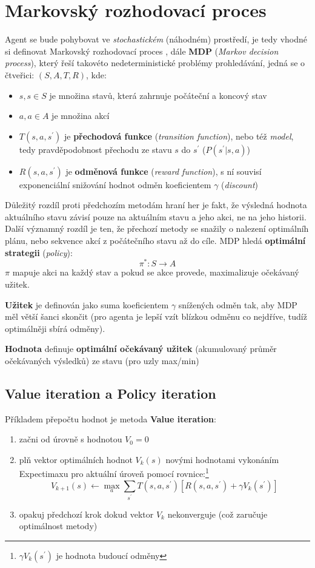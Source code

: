 \section{Markovský rozhodovací proces}
Agent se bude pohybovat ve \textit{stochastickém} (náhodném) prostředí, je tedy vhodné si definovat Markovský rozhodovací proces \cite{RLAprox}, dále \textbf{MDP} (\textit{Markov decision process}), který řeší takovéto nedeterministické problémy prohledávání, jedná se o čtveřici:
$(S,A,T,R)$, kde:
\begin{itemize}
\item $s, s \in S$ je množina stavů, která zahrnuje počáteční a koncový stav
\item $a, a \in A$ je množina akcí
\item $T(s,a,s^\prime)$ je \textbf{přechodová funkce} (\textit{transition function}), nebo též \textit{model}, tedy pravděpodobnost přechodu ze stavu $s$ do $s^\prime$ ($P(s^\prime| s, a) $)
\item $R(s,a,s^\prime)$ je  \textbf{odměnová funkce} (\textit{reward function}), s ní souvisí exponenciální snižování hodnot odměn koeficientem $\gamma$ (\textit{discount})
\end{itemize}
Důležitý rozdíl proti předchozím metodám hraní her je fakt, že výsledná hodnota aktuálního stavu závisí pouze na aktuálním stavu a jeho akci, ne na jeho historii.
Další významný rozdíl je ten, že přechozí metody se snažily o nalezení optimálníh plánu, nebo sekvence akcí z počátečního stavu až do cíle. MDP hledá \textbf{optimální strategii} (\textit{policy}):
\begin{displaymath}
\pi^*: S \to A
\end{displaymath}
$\pi$ mapuje akci na každý stav a pokud se akce provede, maximalizuje očekávaný užitek.

\textbf{Užitek} je definován jako suma koeficientem $\gamma$ snížených odměn tak, aby MDP měl větší šanci skončit (pro agenta je lepší vzít blízkou odměnu co nejdříve, tudíž optimálněji sbírá odměny).

\textbf{Hodnota} definuje \textbf{optimální očekávaný užitek} (akumulovaný průměr očekávaných výsledků) ze stavu (pro uzly max/min)

\subsection{Value iteration a Policy iteration}
Příkladem přepočtu hodnot je metoda \textbf{Value iteration}\cite{RLAprox}:
\begin{enumerate}
\item začni od úrovně s hodnotou $V_{0} = 0$
\item plň vektor optimálních hodnot $V_{k}(s)$ novými hodnotami vykonáním Expectimaxu pro aktuální úroveň pomocí rovnice:\footnote{$\gamma V_k(s^\prime)$ je hodnota budoucí odměny}
\begin{displaymath}
V_{k+1}(s) \leftarrow \max_a \sum_{s^\prime}T(s,a,s^\prime) \left[R(s,a,s^\prime)+\gamma V_k(s^\prime) \right]
\end{displaymath}
\item opakuj předchozí krok dokud vektor $V_k$ nekonverguje (což zaručuje optimálnost metody)
\end{enumerate}

